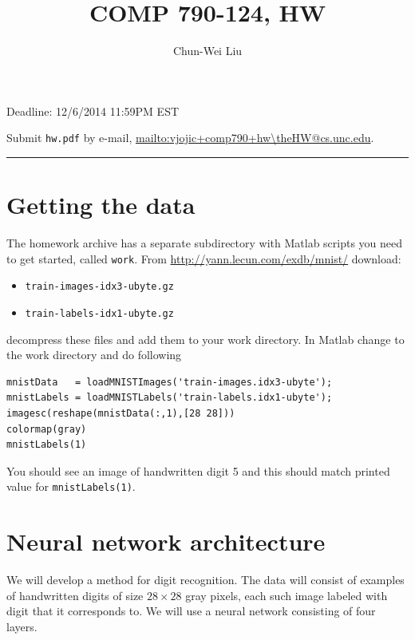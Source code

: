 \documentclass{article}
\begin{document}
\author{Chun-Wei Liu}
\setcounter{HW}{3}
\title{COMP  790-124, HW\theHW}
\maketitle

{ Deadline: 12/6/2014 11:59PM EST}

{ Submit \texttt{hw\theHW.pdf} by e-mail,  \url{mailto:vjojic+comp790+hw\theHW@cs.unc.edu}}.

\hrule

\section{Getting the data}

The homework archive has a separate subdirectory with Matlab scripts you need to get started, called \texttt{work}.
From \url{http://yann.lecun.com/exdb/mnist/} download:
\begin{itemize}
\item \texttt{train-images-idx3-ubyte.gz}
\item \texttt{train-labels-idx1-ubyte.gz}
\end{itemize}
decompress these files and add them to your work directory.
In Matlab change to the work directory and do following
\begin{verbatim}
mnistData   = loadMNISTImages('train-images.idx3-ubyte');
mnistLabels = loadMNISTLabels('train-labels.idx1-ubyte');
imagesc(reshape(mnistData(:,1),[28 28]))
colormap(gray)
mnistLabels(1)
\end{verbatim}
You should see an image of handwritten digit 5 and this should match printed value for \texttt{mnistLabels(1)}.


\section{Neural network architecture}

We will develop a method for digit recognition. The data will consist of examples of handwritten
digits of size $28 \times 28$ gray pixels, each such image labeled with digit that it corresponds to.
We will use a neural network consisting of four layers.
\end{document}
